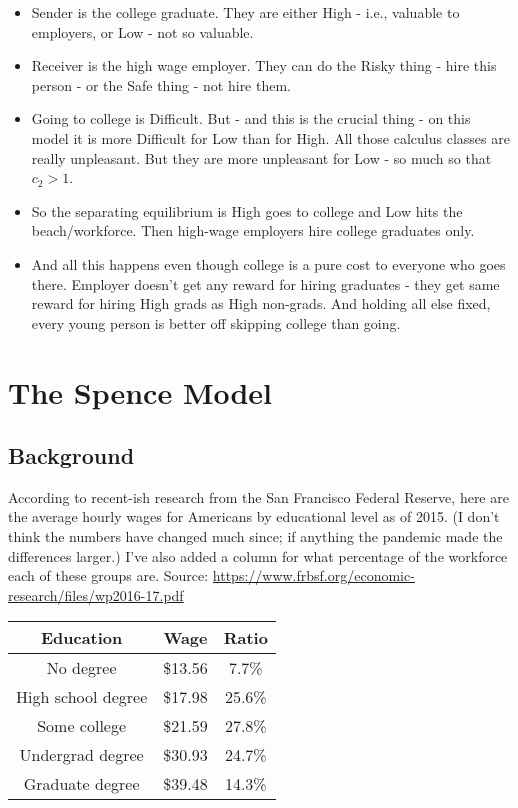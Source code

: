 \documentclass[
  11pt,
]{article}
\providecommand{\tightlist}{%
  \setlength{\itemsep}{0pt}\setlength{\parskip}{0pt}}
\begin{document}
\begin{itemize}
\tightlist
\item
  Sender is the college graduate. They are either High - i.e., valuable
  to employers, or Low - not so valuable.
\item
  Receiver is the high wage employer. They can do the Risky thing - hire
  this person - or the Safe thing - not hire them.
\item
  Going to college is Difficult. But - and this is the crucial thing -
  on this model it is more Difficult for Low than for High. All those
  calculus classes are really unpleasant. But they are more unpleasant
  for Low - so much so that \(c_2 > 1\).
\item
  So the separating equilibrium is High goes to college and Low hits the
  beach/workforce. Then high-wage employers hire college graduates only.
\item
  And all this happens even though college is a pure cost to everyone
  who goes there. Employer doesn't get any reward for hiring graduates -
  they get same reward for hiring High grads as High non-grads. And
  holding all else fixed, every young person is better off skipping
  college than going.
\end{itemize}

\hypertarget{the-spence-model}{%
\section{The Spence Model}\label{the-spence-model}}

\hypertarget{background}{%
\subsection{Background}\label{background}}

According to recent-ish research from the San Francisco Federal Reserve,
here are the average hourly wages for Americans by educational level as
of 2015. (I don't think the numbers have changed much since; if anything
the pandemic made the differences larger.) I've also added a column for
what percentage of the workforce each of these groups are. Source:
\url{https://www.frbsf.org/economic-research/files/wp2016-17.pdf}

\begin{longtable}[]{@{}ccc@{}}
\toprule
Education & Wage & Ratio \\
\midrule
\endhead
No degree & \$13.56 & 7.7\% \\
High school degree & \$17.98 & 25.6\% \\
Some college & \$21.59 & 27.8\% \\
Undergrad degree & \$30.93 & 24.7\% \\
Graduate degree & \$39.48 & 14.3\% \\
\bottomrule
\end{longtable}
\end{document}
